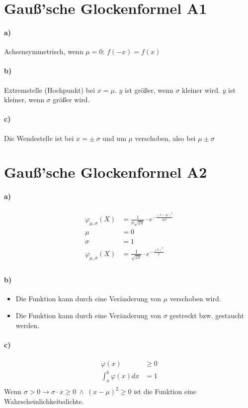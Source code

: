 \documentclass[12pt,a4paper]{report}
\begin{document}
	\section{Gauß'sche Glockenformel A1}
	\paragraph{a)}
	Achsensymmetrisch, wenn $\mu=0$: $f(-x) = f(x)$
	\paragraph{b)}
	Extremstelle (Hochpunkt) bei $x=\mu$. $y$ ist größer, wenn $\sigma$ kleiner wird. $y$ ist kleiner, wenn $\sigma$ größer wird.
	\paragraph{c)}	
	Die Wendestelle ist bei $x = \pm\ \sigma$ und um $\mu$ verschoben, also bei $\mu \pm \sigma$
	\section{Gauß'sche Glockenformel A2}
	\paragraph{a)}
	\begin{align*}
		\varphi_{\mu,\sigma} (X) &= \frac{1}{\sigma\sqrt{2\pi}} \cdot e^{-\frac{(x-\mu)^2}{2\sigma^2}} \\
		\mu &= 0 \\
		\sigma &= 1 \\
		\varphi_{\mu,\sigma} (X) &= \frac{1}{\sqrt{2\pi}} \cdot e^{-\frac{(x)^2}{2}} \\
	\end{align*}
	\paragraph{b)}
	\begin{itemize}
		\item Die Funktion kann durch eine Veränderung von $\mu$ verschoben wird.
		\item Die Funktion kann durch eine Veränderung von $\sigma$ gestreckt bzw. gestaucht werden.
	\end{itemize}
	\paragraph{c)}
	\begin{align*}
		\varphi(x) &\geq 0 \\
		\int_a^b \varphi(x) dx &= 1 \\
	\end{align*}
	Wenn $\sigma > 0 \to \sigma \cdot x \geq 0\ \land\ (x-\mu)^2 \geq 0$ ist die Funktion eine Wahrscheinlichkeitsdichte.
\end{document}
